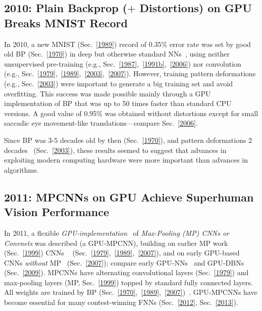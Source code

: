 \documentclass[letterpaper]{article}
\begin{document}
\begin{CJK*}{UTF8}{gbsn}
\subsection{2010: Plain Backprop ($+$ Distortions) on GPU Breaks MNIST Record}
\label{2010}

 In 2010, a new MNIST (Sec.~\ref{1989}) record of 0.35\% error rate was set 
by good old BP (Sec.~\ref{1970}) in deep but otherwise
standard NNs~\citep{ciresan:2010}, 
using neither unsupervised pre-training 
(e.g., Sec.~\ref{1987},~\ref{1991b},~\ref{2006}) nor convolution 
(e.g., Sec.~\ref{1979},~\ref{1989},~\ref{2003},~\ref{2007}).
However,  training pattern
deformations (e.g., Sec.~\ref{2003}) were important to generate a big training set
and avoid overfitting.
This success was made possible mainly through a  GPU implementation of BP that was up to 50 times faster than standard
CPU versions. 
A good value of 0.95\% was obtained
without distortions except for small saccadic eye movement-like translations---compare
Sec.~\ref{2006}.

Since BP was 3-5 decades old by then (Sec.~\ref{1970}),
and pattern deformations 2 decades~\citep{Baird90} (Sec.~\ref{2003}),
these results seemed to suggest that
advances in exploiting modern
computing hardware were more important than advances in algorithms. 


\subsection{2011: MPCNNs on GPU Achieve Superhuman Vision Performance}
\label{2011}

In 2011, a flexible {\em GPU-implementation}~\citep{ciresan:2011ijcai}
 of {\em Max-Pooling (MP) CNNs or Convnets}  was  described (a GPU-MPCNN),
building on earlier MP work~\citep{weng1992} (Sec.~\ref{1999}) CNNs ~\citep{Fukushima:1979neocognitron,LeCun:89} (Sec.~\ref{1979},~\ref{1989},~\ref{2007}), 
and on early GPU-based CNNs {\em without} MP~\citep{chellapilla:2006b} (Sec.~\ref{2007});
compare  early GPU-NNs~\citep{gpu2004} and GPU-DBNs~\citep{raina2009large} (Sec.~\ref{2009}).
MPCNNs have alternating convolutional layers (Sec.~\ref{1979}) and max-pooling layers (MP, Sec.~\ref{1999}) topped by 
standard fully connected layers. All weights are trained by BP (Sec.~\ref{1970},~\ref{1989},~\ref{2007})~\citep{ranzato-cvpr-07,scherer:2010}.
GPU-MPCNNs have become essential for many contest-winning
FNNs (Sec.~\ref{2012}, Sec.~\ref{2013}).




\end{CJK*}
\end{document}
